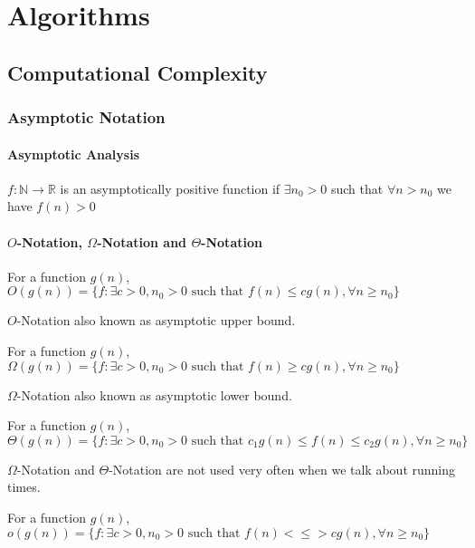 \part{Algorithms}
	\chapter{Computational Complexity}
		\section{Asymptotic Notation}
			\subsection{Asymptotic Analysis}
				\begin{definition}
					$f: \mathbb{N} \rightarrow \mathbb{R}$ is an asymptotically positive function if $\exists n_0 > 0$ such that $\forall n > n_0$ we have $f(n) > 0$
				\end{definition}

			\subsection{\texorpdfstring{$O$}{O}-Notation, \texorpdfstring{$\Omega$}{Omega}-Notation and \texorpdfstring{$\Theta$}{Theta}-Notation}
				\begin{definition}[$O$-Notation]
					For a function $g(n)$, $O(g(n)) = \{f: \exists c > 0, n_0 > 0 \text{ such that } f(n) \le cg(n), \forall n\ge n_0\}$
				\end{definition}
				$O$-Notation also known as asymptotic upper bound. 

				\begin{definition}
					For a function $g(n)$, $\Omega(g(n)) = \{f: \exists c > 0, n_0 > 0 \text{ such that } f(n) \ge cg(n), \forall n\ge n_0\}$
				\end{definition}
				$\Omega$-Notation also known as asymptotic lower bound.

				\begin{definition}
					For a function $g(n)$, $\Theta(g(n)) = \{f: \exists c > 0, n_0 > 0 \text{ such that }  c_1g(n) \le f(n) \le c_2g(n), \forall n\ge n_0\}$
				\end{definition}
				$\Omega$-Notation and $\Theta$-Notation are not used very often when we talk about running times.

				\begin{definition}[$o$-Notation]
					For a function $g(n)$, $o(g(n)) = \{f: \exists c > 0, n_0 > 0 \text{ such that } f(n) <\le> cg(n), \forall n\ge n_0\}$
				\end{definition}


